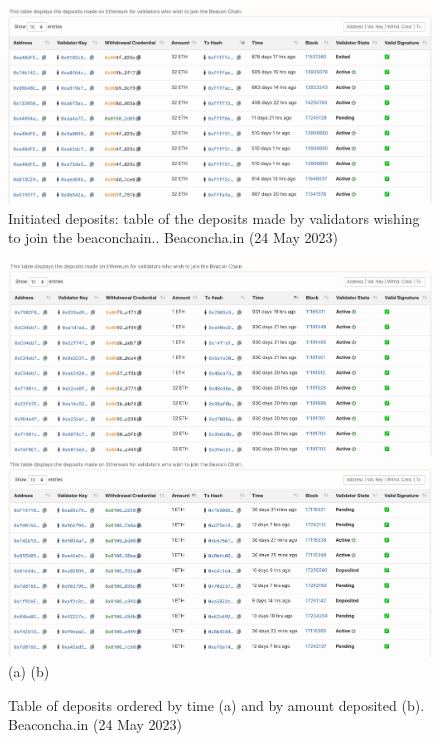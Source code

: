 \documentclass[UTF8]{article}
\begin{document}
\begin{figure}[htbp]
\begin{center}
\includegraphics[width=0.9\linewidth]{images/bdeposittbl}
\caption{Initiated deposits: table of the deposits made by validators wishing to join the beaconchain.. Beaconcha.in (24 May 2023)}
\label{fig:bdeposittbl}
\end{center}
\end{figure}

\begin{figure}[htbp]
\begin{center}
\includegraphics[width=0.48\linewidth]{images/bdeposittbltime}
\includegraphics[width=0.48\linewidth]{images/bdeposittblamount} \\
(a)\hspace{160pt}        (b)\\
\caption{Table of deposits ordered by time (a) and by amount deposited (b). Beaconcha.in (24 May 2023)}
\label{fig:bdeposittbltime}
\end{center}
\end{figure}
\end{document}
